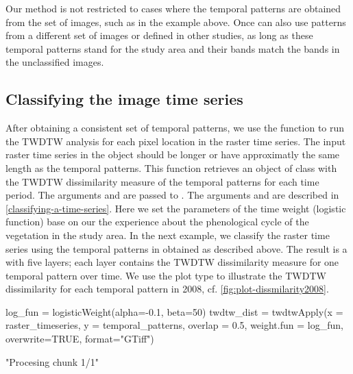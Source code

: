\documentclass[article,shortnames]{jss}
\begin{document}
Our method is not restricted to cases where the temporal patterns are
obtained from the set of images, such as in the example above. Once can
also use patterns from a different set of images or defined in other
studies, as long as these temporal patterns stand for the study area and
their bands match the bands in the unclassified images.

\subsection{Classifying the image time
series}\label{classifying-the-image-time-series}

After obtaining a consistent set of temporal patterns, we use the
function  to run the TWDTW analysis for each pixel
location in the raster time series. The input raster time series in the
object  should be longer or have approximatly the same
length as the temporal patterns. This function retrieves an object of
class  with the TWDTW dissimilarity measure of the
temporal patterns for each time period. The arguments 
and  are passed to . The
arguments  and  are described in
\autoref{classifying-a-time-series}. Here we set the parameters of the
time weight (logistic function) base on our the experience about the
phenological cycle of the vegetation in the study area. In the next
example, we classify the raster time series using the temporal patterns
in  obtained as described above. The result is a
 with five layers; each layer contains the TWDTW
dissimilarity measure for one temporal pattern over time. We use the
plot type  to illustrate the TWDTW dissimilarity for each
temporal pattern in 2008, cf. \autoref{fig:plot-dissmilarity2008}.

\begin{CodeChunk}
\begin{CodeInput}
log_fun = logisticWeight(alpha=-0.1, beta=50) 
twdtw_dist = twdtwApply(x = raster_timeseries, y = temporal_patterns, 
  overlap = 0.5, weight.fun = log_fun, overwrite=TRUE, format="GTiff")
\end{CodeInput}
\begin{CodeOutput}
[1] "Procesing chunk 1/1"
\end{CodeOutput}
\end{CodeChunk}
\end{document}
